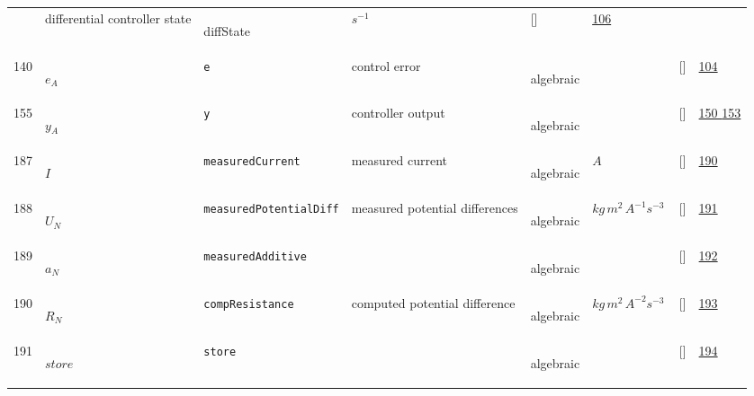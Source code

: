 \begin{longtable}{|p{1cm}|p{3cm}|p{3cm}|p{7cm}|p{3.0cm}|p{3cm}|p{2cm}|p{1cm}|}
             & differential controller state
             & \begin{lay}diffState \end{lay}
             & $ s^{-1} \, $
             & []
             & \hyperlink{"e:106"}{ 106 }
                 \\
    140
             & \hypertarget{"v:140"}{ $ {e}{_{A}} $}
             & \verb|e|
             & control error
             & \begin{lay}algebraic \end{lay}
             & $  $
             & []
             & \hyperlink{"e:104"}{ 104 }
                 \\
    155
             & \hypertarget{"v:155"}{ $ {y}{_{A}} $}
             & \verb|y|
             & controller output
             & \begin{lay}algebraic \end{lay}
             & $  $
             & []
             & \hyperlink{"e:150"}{ 150 }
                 \hyperlink{"e:153"}{ 153 }
                 \\
    187
             & \hypertarget{"v:187"}{ $ {I}{_{}} $}
             & \verb|measuredCurrent|
             & measured current
             & \begin{lay}algebraic \end{lay}
             & $ A \, $
             & []
             & \hyperlink{"e:190"}{ 190 }
                 \\
    188
             & \hypertarget{"v:188"}{ $ {U}{_{N}} $}
             & \verb|measuredPotentialDiff|
             & measured potential differences
             & \begin{lay}algebraic \end{lay}
             & $ kg \,m^{2} \,A^{-1} s^{-3} \, $
             & []
             & \hyperlink{"e:191"}{ 191 }
                 \\
    189
             & \hypertarget{"v:189"}{ $ {a}{_{N}} $}
             & \verb|measuredAdditive|
             & 
             & \begin{lay}algebraic \end{lay}
             & $  $
             & []
             & \hyperlink{"e:192"}{ 192 }
                 \\
    190
             & \hypertarget{"v:190"}{ $ {R}{_{N}} $}
             & \verb|compResistance|
             & computed potential difference
             & \begin{lay}algebraic \end{lay}
             & $ kg \,m^{2} \,A^{-2} s^{-3} \, $
             & []
             & \hyperlink{"e:193"}{ 193 }
                 \\
    191
             & \hypertarget{"v:191"}{ $ {store}{_{}} $}
             & \verb|store|
             & 
             & \begin{lay}algebraic \end{lay}
             & $  $
             & []
             & \hyperlink{"e:194"}{ 194 }
                 \\
    \end{longtable}